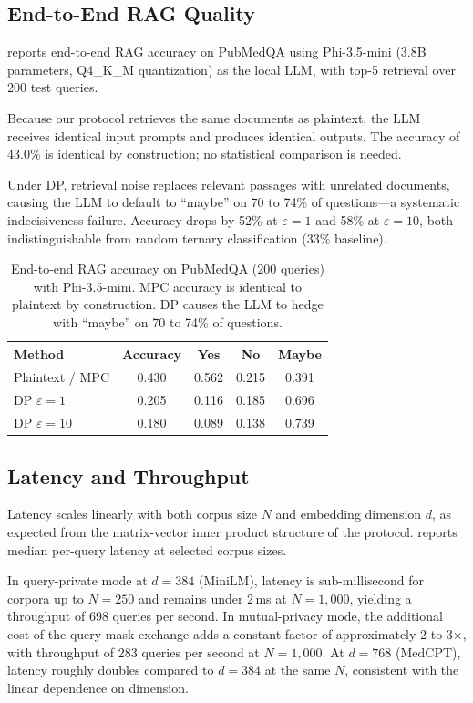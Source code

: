 \documentclass[conference]{IEEEtran}
\begin{document}
\subsection{End-to-End RAG Quality}
\label{sec:exp_e2e}

 reports end-to-end RAG accuracy on PubMedQA using
Phi-3.5-mini (3.8B parameters, Q4\_K\_M quantization) as the local LLM,
with top-5 retrieval over 200 test queries.

Because our protocol retrieves the same documents as plaintext, the LLM
receives identical input prompts and produces identical outputs. The
accuracy of 43.0\% is identical by construction; no statistical comparison
is needed.

Under DP, retrieval noise replaces relevant passages with unrelated
documents, causing the LLM to default to ``maybe'' on 70 to 74\% of
questions---a systematic indecisiveness failure. Accuracy drops by 52\%
at $\varepsilon = 1$ and 58\% at $\varepsilon = 10$, both
indistinguishable from random ternary classification (33\% baseline).

\begin{table}[t]
\caption{End-to-end RAG accuracy on PubMedQA (200 queries) with
Phi-3.5-mini. MPC accuracy is identical to plaintext by construction.
DP causes the LLM to hedge with ``maybe'' on 70 to 74\% of questions.}
\label{tab:e2e}
\centering
\small
\begin{tabular}{@{}lcccc@{}}
\toprule
Method & Accuracy & Yes & No & Maybe \\
\midrule
Plaintext / MPC & 0.430 & 0.562 & 0.215 & 0.391 \\
DP $\varepsilon{=}1$ & 0.205 & 0.116 & 0.185 & 0.696 \\
DP $\varepsilon{=}10$ & 0.180 & 0.089 & 0.138 & 0.739 \\
\bottomrule
\end{tabular}
\end{table}


\subsection{Latency and Throughput}
\label{sec:exp_latency}

Latency scales linearly with both corpus size $N$ and embedding dimension
$d$, as expected from the matrix-vector inner product structure of the
protocol.  reports median per-query latency at selected
corpus sizes.

In query-private mode at $d = 384$ (MiniLM), latency is sub-millisecond
for corpora up to $N = 250$ and remains under 2\,ms at $N = 1{,}000$,
yielding a throughput of 698 queries per second. In mutual-privacy mode,
the additional cost of the query mask exchange adds a constant factor of
approximately 2 to 3$\times$, with throughput of 283 queries per second
at $N = 1{,}000$. At $d = 768$ (MedCPT), latency roughly doubles
compared to $d = 384$ at the same $N$, consistent with the linear
dependence on dimension.
\end{document}
